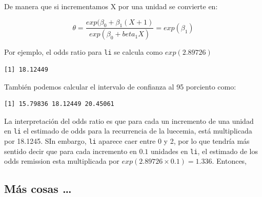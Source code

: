 \documentclass[
  letterpaper,
  DIV=11,
  numbers=noendperiod]{scrartcl}
\newenvironment{Shaded}{\begin{snugshade}}{\end{snugshade}}
\newcommand{\DecValTok}[1]{\textcolor[rgb]{0.68,0.00,0.00}{#1}}
\newcommand{\FloatTok}[1]{\textcolor[rgb]{0.68,0.00,0.00}{#1}}
\newcommand{\FunctionTok}[1]{\textcolor[rgb]{0.28,0.35,0.67}{#1}}
\newcommand{\NormalTok}[1]{\textcolor[rgb]{0.00,0.23,0.31}{#1}}
\newcommand{\SpecialCharTok}[1]{\textcolor[rgb]{0.37,0.37,0.37}{#1}}
\newcommand{\StringTok}[1]{\textcolor[rgb]{0.13,0.47,0.30}{#1}}
\begin{document}
De manera que si incrementamos X por una unidad se convierte en:

\[
\theta = \frac{exp(\beta_0+\beta_1(X+1)}{exp(\beta_0+beta_1X)}=exp(\beta_1)
\]

Por ejemplo, el odds ratio para \texttt{li} se calcula como
\(exp(2.89726)\)

\begin{Shaded}
\end{Shaded}

\begin{verbatim}
[1] 18.12449
\end{verbatim}

También podemos calcular el intervalo de confianza al 95 porciento como:

\begin{Shaded}
\end{Shaded}

\begin{verbatim}
[1] 15.79836 18.12449 20.45061
\end{verbatim}

La interpretación del odds ratio es que para cada un incremento de una
unidad en \texttt{li} el estimado de odds para la recurrencia de la
luecemia, está multiplicada por 18.1245. SIn embargo, \texttt{li}
aparece caer entre 0 y 2, por lo que tendría más sentido decir que para
cada incremento en \(0.1\) unidades en \texttt{li}, el estimado de los
odds remission esta multiplicada por \(exp(2.89726\times 0.1) = 1.336\).
Entonces,

\hypertarget{muxe1s-cosas}{%
\subsection{Más cosas \ldots{}}\label{muxe1s-cosas}}
\end{document}
